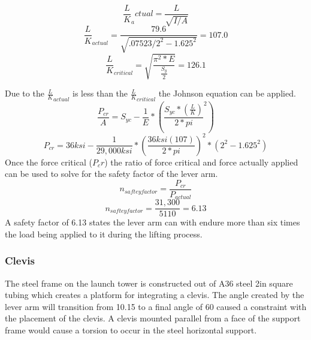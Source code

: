 \documentclass[10pt,a4paper]{article}
\begin{document}
\begin{equation}
\frac{L}{K}_actual = \frac{L}{\sqrt{I/A}}
\end{equation}
\begin{equation}
\frac{L}{K}_{actual} = \frac{79.6}{\sqrt{.07523/2^2-1.625^2}} = 107.0
\end{equation}
\begin{equation}
\frac{L}{K}_ {critical} =\sqrt{\frac{\pi^2*E}{\frac{S_y}{2}}} = 126.1
\end{equation}


Due to the $\frac{L}{K}_{actual}$ is less than the $\frac{L}{K}_ {critical}$ the Johnson equation can be applied.  \\

\begin{equation}
\frac{P_{cr}}{A} = S_{yc} - \frac{1}{E} * (\frac{S_{yc} * (\frac{L}{K})}{2*pi}^2)
\end{equation}
\begin{equation}
{P_{cr}} = 36ksi - \frac{1}{29,000ksi} * (\frac{36ksi(107)}{2*pi})^2 *({2^2-1.625^2})
\end{equation}
Once the force critical ($P_cr$) the ratio of force critical and force actually applied can be used to solve for the safety factor of the lever arm.   \\
\begin{equation}
n_{saftey factor} = \frac{P_{cr}}{P_{actual}}
\end{equation}
\begin{equation}
	n_{saftey factor} = \frac{31,300}{5110} = 6.13
\end{equation}
A safety factor of 6.13 states the lever arm can with endure more than six times the load being applied to it during the lifting process. 

\subsubsection{Clevis}
The steel frame on the launch tower is constructed out of A36 steel 2in square tubing which creates a platform for integrating a clevis. The angle created by the lever arm will transition from 10.15 to a final angle of 60 caused a constraint with the placement of the clevis. A clevis mounted parallel from a face of the support frame would cause a torsion to occur in the steel horizontal support. \\
\end{document}
